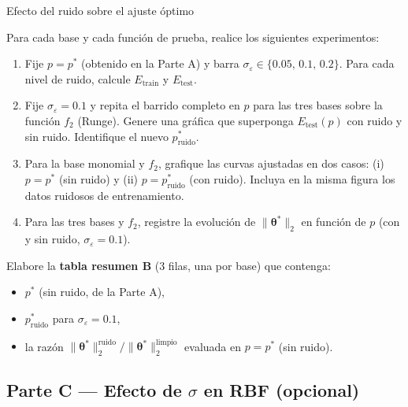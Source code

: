 \begin{ejerciciocomp}{Efecto del ruido sobre el ajuste óptimo}
\label{ej:ruido}

Para cada base y cada función de prueba, realice los siguientes experimentos:

\begin{enumerate}[leftmargin=2em, label=\alph*)]
  \item Fije $p = p^*$ (obtenido en la Parte A) y barra $\sigma_\varepsilon \in \{0.05,\,0.1,\,0.2\}$. Para cada nivel de ruido, calcule $E_{\mathrm{train}}$ y $E_{\mathrm{test}}$.
  \item Fije $\sigma_\varepsilon = 0.1$ y repita el barrido completo en $p$ para las tres bases sobre la función $f_2$ (Runge). Genere una gráfica que superponga $E_{\mathrm{test}}(p)$ con ruido y sin ruido. Identifique el nuevo $p^*_{\mathrm{ruido}}$.
  \item Para la base monomial y $f_2$, grafique las curvas ajustadas en dos casos: (i) $p = p^*$ (sin ruido) y (ii) $p = p^*_{\mathrm{ruido}}$ (con ruido). Incluya en la misma figura los datos ruidosos de entrenamiento.
  \item Para las tres bases y $f_2$, registre la evolución de $\|\boldsymbol{\theta}^*\|_2$ en función de $p$ (con y sin ruido, $\sigma_\varepsilon=0.1$).
\end{enumerate}

Elabore la \textbf{tabla resumen B} (3 filas, una por base) que contenga:
\begin{itemize}[nosep, leftmargin=1.5em]
  \item $p^*$ (sin ruido, de la Parte A),
  \item $p^*_{\mathrm{ruido}}$ para $\sigma_\varepsilon=0.1$,
  \item la razón $\|\boldsymbol{\theta}^*\|_2^{\text{ruido}} / \|\boldsymbol{\theta}^*\|_2^{\text{limpio}}$ evaluada en $p = p^*$ (sin ruido).
\end{itemize}
\end{ejerciciocomp}


\subsection*{Parte C — Efecto de $\sigma$ en RBF (opcional)}
\label{sec:parteC}


